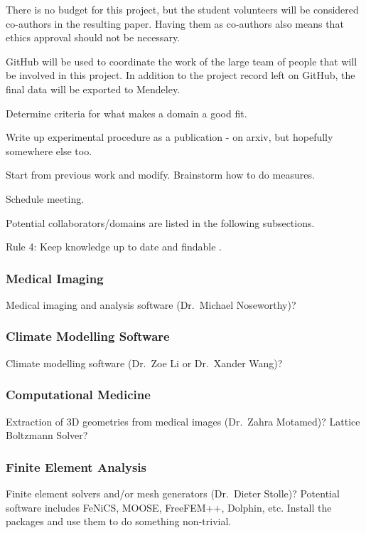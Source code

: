 \documentclass[12pt]{article}
\begin{document}
There is no budget for this project, but the student volunteers will be
considered co-authors in the resulting paper.  Having them as co-authors also
means that ethics approval should not be necessary.

GitHub will be used to coordinate the work of the large team of people that will
be involved in this project.  In addition to the project record left on GitHub,
the final data will be exported to Mendeley.

Determine criteria for what makes a domain a good fit.

Write up experimental procedure as a publication - on arxiv, but hopefully
somewhere else too.

Start from previous work and modify.  Brainstorm how to do measures.

Schedule meeting.

Potential collaborators/domains are listed in the following subsections.

Rule 4: Keep knowledge up to date and findable \citep{ShollerEtAl2019}.

\subsubsection{Medical Imaging}

Medical imaging and analysis software (Dr.\ Michael Noseworthy)?

\subsubsection{Climate Modelling Software}

Climate modelling software (Dr.\ Zoe Li or Dr.\ Xander Wang)?

\subsubsection{Computational Medicine}

Extraction of 3D geometries from medical images (Dr.\ Zahra Motamed)?  Lattice
Boltzmann Solver?

\subsubsection{Finite Element Analysis}

Finite element solvers and/or mesh generators (Dr.\ Dieter Stolle)?  Potential
software includes FeNiCS, MOOSE, FreeFEM++, Dolphin, etc.  Install the packages
and use them to do something non-trivial.
\end{document}
